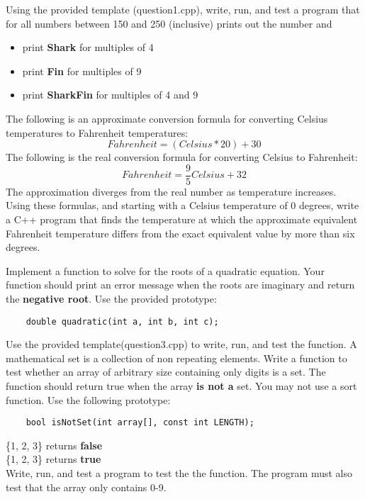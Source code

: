 \documentclass[addpoints,12pt]{exam}
\begin{document}
\begin{questions}

\question [15]
Using the provided template (question1.cpp), write, run, and test a program that for all numbers between 150 and 250 (inclusive) prints out the number and
\begin{itemize}
	\item print \textbf{Shark} for multiples of 4
	\item print \textbf{Fin} for multiples of 9
	\item print \textbf{SharkFin} for multiples of 4 and 9
\end{itemize}

\question[25]
The following is an approximate conversion formula for converting Celsius temperatures to Fahrenheit temperatures:
\begin{equation}
Fahrenheit = (Celsius*20)+30 
\end{equation}
The following is the real conversion formula for converting Celsius to Fahrenheit:
\begin{equation}
Fahrenheit = \frac{9}{5}Celsius + 32
\end{equation}
The approximation diverges from the real  number as temperature increases. Using these formulas, and starting with a Celsius temperature of 0 degrees, write a C++ program that finds the temperature at which the approximate equivalent Fahrenheit temperature differs from the exact equivalent value by more than six degrees.


\question[25]
Implement a function to solve for the roots of a quadratic equation. Your function should print an error message when the roots are imaginary and return the \textbf{negative root}.  Use the provided prototype:
\begin{lstlisting}
	double quadratic(int a, int b, int c);
\end{lstlisting}
Use the provided template(question3.cpp) to write, run, and test the function.
\pagebreak
\question[35]
A mathematical set is a collection of non repeating elements. Write a function to test whether an array of arbitrary size containing only digits is a set. The function should return true when the array \textbf{is not a} set. You may not use a sort function. Use the following prototype:
\begin{lstlisting}
	bool isNotSet(int array[], const int LENGTH);
\end{lstlisting}

\{1, 2, 3\} returns \textbf{false}\\
\{1, 2, 3\} returns \textbf{true}\\

Write, run, and test a program to test the the function. The program must also test that the array only contains 0-9.

\end{questions}
\end{document}
